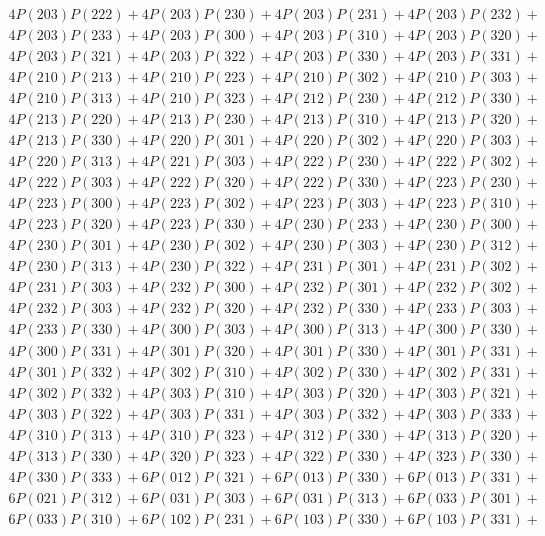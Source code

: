 \begin{align*}
	4P(203)P(222) + 4P(203)P(230) + 4P(203)P(231) + 4P(203)P(232)+ \\ 
	4P(203)P(233) + 4P(203)P(300) + 4P(203)P(310) + 4P(203)P(320)+ \\ 
	4P(203)P(321) + 4P(203)P(322) + 4P(203)P(330) + 4P(203)P(331)+ \\ 
	4P(210)P(213) + 4P(210)P(223) + 4P(210)P(302) + 4P(210)P(303)+ \\ 
	4P(210)P(313) + 4P(210)P(323) + 4P(212)P(230) + 4P(212)P(330)+ \\ 
	4P(213)P(220) + 4P(213)P(230) + 4P(213)P(310) + 4P(213)P(320)+ \\ 
	4P(213)P(330) + 4P(220)P(301) + 4P(220)P(302) + 4P(220)P(303)+ \\ 
	4P(220)P(313) + 4P(221)P(303) + 4P(222)P(230) + 4P(222)P(302)+ \\ 
	4P(222)P(303) + 4P(222)P(320) + 4P(222)P(330) + 4P(223)P(230)+ \\ 
	4P(223)P(300) + 4P(223)P(302) + 4P(223)P(303) + 4P(223)P(310)+ \\ 
	4P(223)P(320) + 4P(223)P(330) + 4P(230)P(233) + 4P(230)P(300)+ \\ 
	4P(230)P(301) + 4P(230)P(302) + 4P(230)P(303) + 4P(230)P(312)+ \\ 
	4P(230)P(313) + 4P(230)P(322) + 4P(231)P(301) + 4P(231)P(302)+ \\ 
	4P(231)P(303) + 4P(232)P(300) + 4P(232)P(301) + 4P(232)P(302)+ \\ 
	4P(232)P(303) + 4P(232)P(320) + 4P(232)P(330) + 4P(233)P(303)+ \\ 
	4P(233)P(330) + 4P(300)P(303) + 4P(300)P(313) + 4P(300)P(330)+ \\ 
	4P(300)P(331) + 4P(301)P(320) + 4P(301)P(330) + 4P(301)P(331)+ \\ 
	4P(301)P(332) + 4P(302)P(310) + 4P(302)P(330) + 4P(302)P(331)+ \\ 
	4P(302)P(332) + 4P(303)P(310) + 4P(303)P(320) + 4P(303)P(321)+ \\ 
	4P(303)P(322) + 4P(303)P(331) + 4P(303)P(332) + 4P(303)P(333)+ \\ 
	4P(310)P(313) + 4P(310)P(323) + 4P(312)P(330) + 4P(313)P(320)+ \\ 
	4P(313)P(330) + 4P(320)P(323) + 4P(322)P(330) + 4P(323)P(330)+ \\ 
	4P(330)P(333) + 6P(012)P(321) + 6P(013)P(330) + 6P(013)P(331)+ \\ 
	6P(021)P(312) + 6P(031)P(303) + 6P(031)P(313) + 6P(033)P(301)+ \\ 
	6P(033)P(310) + 6P(102)P(231) + 6P(103)P(330) + 6P(103)P(331)+ \\ 

\end{align*}
